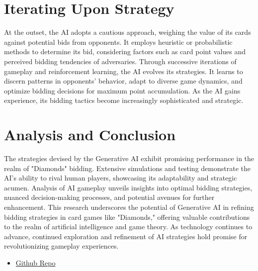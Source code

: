 \documentclass{article}
\begin{document}
\section{Iterating Upon Strategy}
At the outset, the AI adopts a cautious approach, weighing the value of its cards against potential bids from opponents. It employs heuristic or probabilistic methods to determine its bid, considering factors such as card point values and perceived bidding tendencies of adversaries. Through successive iterations of gameplay and reinforcement learning, the AI evolves its strategies. It learns to discern patterns in opponents' behavior, adapt to diverse game dynamics, and optimize bidding decisions for maximum point accumulation. As the AI gains experience, its bidding tactics become increasingly sophisticated and strategic.

\section{Analysis and Conclusion}
The strategies devised by the Generative AI exhibit promising performance in the realm of "Diamonds" bidding. Extensive simulations and testing demonstrate the AI's ability to rival human players, showcasing its adaptability and strategic acumen. Analysis of AI gameplay unveils insights into optimal bidding strategies, nuanced decision-making processes, and potential avenues for further enhancement. This research underscores the potential of Generative AI in refining bidding strategies in card games like "Diamonds," offering valuable contributions to the realm of artificial intelligence and game theory. As technology continues to advance, continued exploration and refinement of AI strategies hold promise for revolutionizing gameplay experiences.


\begin{itemize}
    \item \href{https://github.com/fromjyce/WE-Module3/tree/main/GenAI-Assignment-5}{Github Repo}
\end{itemize}
\end{document}
